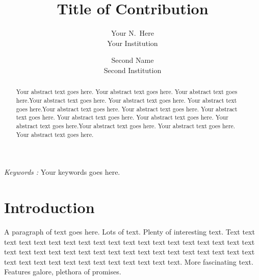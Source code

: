 \documentclass[11pt]{article}
\begin{document}
	
	\date{}
	
	\title{\Large \bf Title of Contribution}
	
	\author{
		{\rm Your N.\ Here}\\
		Your Institution
		\and
		{\rm Second Name}\\
		Second Institution
	} %
	
	\maketitle
	
	
	\begin{abstract}
		Your abstract text goes here. Your abstract text goes here. Your abstract text goes here.Your abstract text goes here. Your abstract text goes here. Your abstract text goes here.Your abstract text goes here. Your abstract text goes here. Your abstract text goes here. Your abstract text goes here. Your abstract text goes here. Your abstract text goes here.Your abstract text goes here. Your abstract text goes here. Your abstract text goes here.
	\end{abstract}
	
\vspace{0.1cm}
\textit{Keywords : }\textsf{Your keywords goes here.}
	\section{Introduction}
	
	A paragraph of text goes here. Lots of text. Plenty of interesting
	text. Text text text text text text text text text text text text text
	text text text text text text text text text text text text text text
	text text text text text text text text text text text text text text
	text text text text text text text.
	More fascinating text. Features galore, plethora of promises.
	
\end{document}
